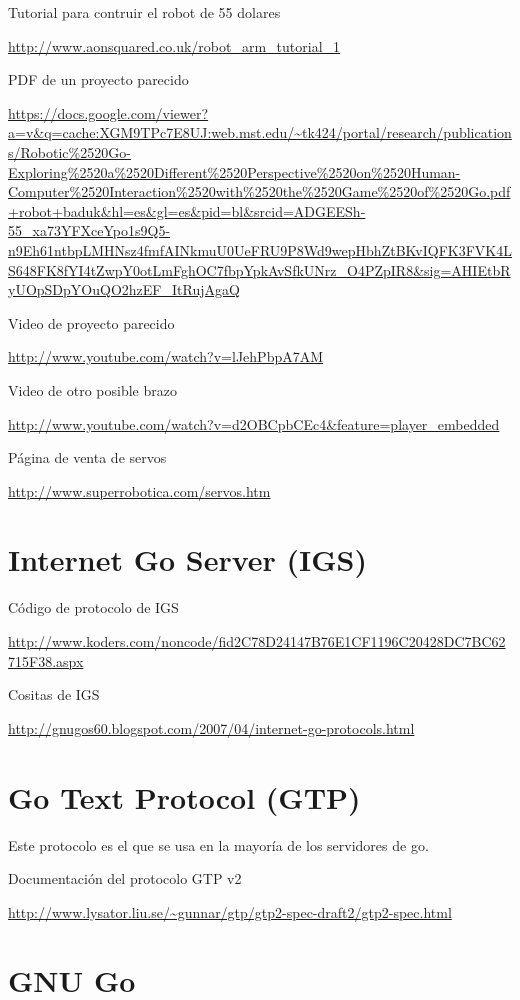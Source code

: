 \documentclass[12pt,a4paper]{report}
\begin{document}
Tutorial para contruir el robot de 55 dolares

\url{http://www.aonsquared.co.uk/robot_arm_tutorial_1}

PDF de un proyecto parecido

\url{https://docs.google.com/viewer?a=v&q=cache:XGM9TPc7E8UJ:web.mst.edu/~tk424/portal/research/publications/Robotic%
}

Video de proyecto parecido

\url{http://www.youtube.com/watch?v=lJehPbpA7AM}

Video de otro posible brazo

\url{http://www.youtube.com/watch?v=d2OBCpbCEc4&feature=player_embedded}

Página de venta de servos

\url{http://www.superrobotica.com/servos.htm}


\section{Internet Go Server (IGS)}

Código de protocolo de IGS

\url{http://www.koders.com/noncode/fid2C78D24147B76E1CF1196C20428DC7BC62715F38.aspx}

Cositas de IGS

\url{http://gnugos60.blogspot.com/2007/04/internet-go-protocols.html}

\section{Go Text Protocol (GTP)}

Este protocolo es el que se usa en la mayoría de los servidores de go. 

Documentación del protocolo GTP v2

\url{http://www.lysator.liu.se/~gunnar/gtp/gtp2-spec-draft2/gtp2-spec.html }

\section{GNU Go}
\end{document}
